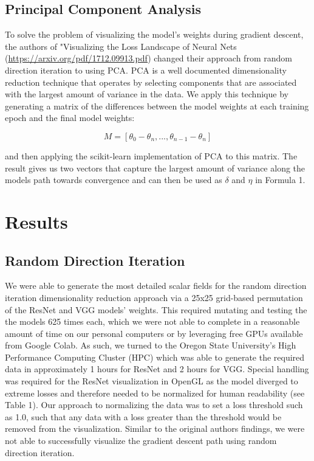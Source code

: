 \documentclass{acmsiggraph}
\begin{document}
\subsection{Principal Component Analysis}

To solve the problem of visualizing the model's weights during gradient descent, the authors of "Visualizing the Loss Landscape of Neural Nets (\url{https://arxiv.org/pdf/1712.09913.pdf}) changed their approach from random direction iteration to using PCA. PCA is a well documented dimensionality reduction technique that operates by selecting components that are associated with the largest amount of variance in the data. We apply this technique by generating a matrix of the differences between the model weights at each training epoch and the final model weights:

\begin{equation} \label{eq1}
M = [\theta_0 - \theta_n, . . ., \theta_{n-1} - \theta_n]
\end{equation}

and then applying the scikit-learn implementation of PCA to this matrix. The result gives us two vectors that capture the largest amount of variance along the models path towards convergence and can then be used as $\delta$ and $\eta$ in Formula 1.

\section{Results}
\label{sec:intro}

\subsection{Random Direction Iteration}
We were able to generate the most detailed scalar fields for the random direction iteration dimensionality reduction approach via a 25x25 grid-based permutation of the ResNet and VGG models' weights. This required mutating and testing the the models 625 times each, which we were not able to complete in a reasonable amount of time on our personal computers or by leveraging free GPUs available from Google Colab. As such, we turned to the Oregon State University's High Performance Computing Cluster (HPC) which was able to generate the required data in approximately 1 hours for ResNet and 2 hours for VGG. Special handling was required for the ResNet visualization in OpenGL as the model diverged to extreme losses and therefore needed to be normalized for human readability (see Table 1). Our approach to normalizing the data was to set a loss threshold such as 1.0, such that any data with a loss greater than the threshold would be removed from the visualization. Similar to the original authors findings, we were not able to successfully visualize the gradient descent path using random direction iteration.
\end{document}
